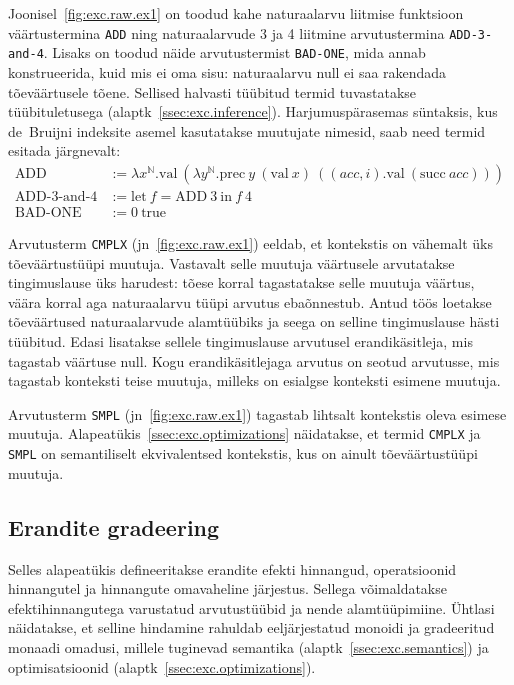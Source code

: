 \documentclass[a4paper,12pt]{article}
\begin{document}
Joonisel~\ref{fig:exc.raw.ex1} on toodud kahe naturaalarvu liitmise funktsioon väärtustermina {\tt ADD}
ning naturaalarvude 3 ja 4 liitmine arvutustermina {\tt ADD-3-and-4}.
Lisaks on toodud näide arvutustermist {\tt BAD-ONE}, mida annab konstrueerida,
kuid mis ei oma sisu: naturaalarvu null ei saa rakendada tõeväärtusele tõene.
Sellised halvasti tüübitud termid tuvastatakse tüübituletusega (alaptk~\ref{ssec:exc.inference}).
Harjumuspärasemas süntaksis, kus de~Bruijni indeksite asemel kasutatakse muutujate nimesid, saab need termid esitada järgnevalt:
\begin{equation*}
\begin{split}
  \text{ADD} &:= \lambda x^\mathbb{N}.\text{val}~(\lambda y^\mathbb{N}.\text{prec}~y~ (\text{val}~x)~((acc,i).\text{val}~(\text{succ}~acc)))\\
  \text{ADD-3-and-4} &:= \text{let}~f=\text{ADD}~3~\text{in}~f~4\\
  \text{BAD-ONE} &:= 0~\text{true}
\end{split}
\end{equation*}

Arvutusterm {\tt CMPLX} (jn~\ref{fig:exc.raw.ex1}) eeldab, et kontekstis on vähemalt üks tõeväärtustüüpi muutuja.
Vastavalt selle muutuja väärtusele arvutatakse tingimuslause üks harudest: tõese korral tagastatakse selle muutuja väärtus, väära korral aga naturaalarvu tüüpi arvutus ebaõnnestub.
Antud töös loetakse tõeväärtused naturaalarvude alamtüübiks ja seega on selline tingimuslause hästi tüübitud.
Edasi lisatakse sellele tingimuslause arvutusel erandikäsitleja, mis tagastab väärtuse null.
Kogu erandikäsitlejaga arvutus on seotud arvutusse, mis tagastab konteksti teise muutuja, milleks on esialgse konteksti esimene muutuja.

Arvutusterm {\tt SMPL} (jn~\ref{fig:exc.raw.ex1}) tagastab lihtsalt kontekstis oleva esimese muutuja.
Alapeatükis~\ref{ssec:exc.optimizations} näidatakse, et termid {\tt CMPLX} ja {\tt SMPL} on semantiliselt ekvivalentsed kontekstis, kus on ainult tõeväärtustüüpi muutuja.

\subsection{Erandite gradeering}\label{ssec:exc.grading}

Selles alapeatükis defineeritakse erandite efekti hinnangud, operatsioonid hinnangutel ja hinnangute omavaheline järjestus.
Sellega võimaldatakse efektihinnangutega varustatud arvutustüübid ja nende alamtüüpimiine.
Ühtlasi näidatakse, et selline hindamine rahuldab eeljärjestatud monoidi ja gradeeritud monaadi omadusi,
millele tuginevad semantika (alaptk~\ref{ssec:exc.semantics}) ja optimisatsioonid (alaptk~\ref{ssec:exc.optimizations}). 
\end{document}
